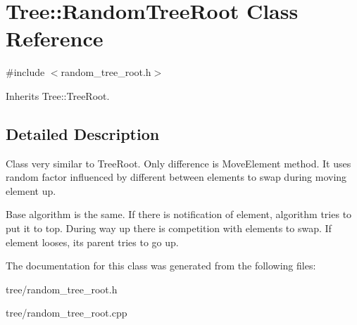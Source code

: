 \hypertarget{classTree_1_1RandomTreeRoot}{\section{Tree\-:\-:Random\-Tree\-Root Class Reference}
\label{classTree_1_1RandomTreeRoot}
}


{\ttfamily \#include $<$random\-\_\-tree\-\_\-root.\-h$>$}



Inherits Tree\-::\-Tree\-Root.



\subsection{Detailed Description}
Class very similar to Tree\-Root. Only difference is Move\-Element method. It uses random factor influenced by different between elements to swap during moving element up.

Base algorithm is the same. If there is notification of element, algorithm tries to put it to top. During way up there is competition with elements to swap. If element looses, its parent tries to go up. 

The documentation for this class was generated from the following files\-:\begin{DoxyCompactItemize}
\item 
tree/random\-\_\-tree\-\_\-root.\-h\item 
tree/random\-\_\-tree\-\_\-root.\-cpp\end{DoxyCompactItemize}
